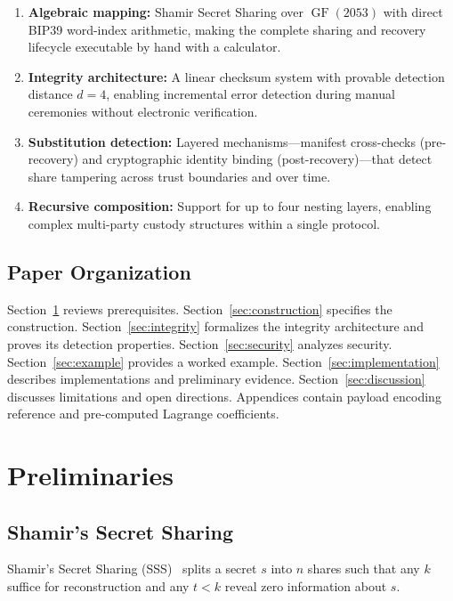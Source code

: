 \documentclass[11pt]{article}
\newcommand{\GF}{\operatorname{GF}}
\begin{document}
\begin{enumerate}[noitemsep]
    \item \textbf{Algebraic mapping:} Shamir Secret Sharing over $\GF(2053)$ with direct BIP39 word-index arithmetic, making the complete sharing and recovery lifecycle executable by hand with a calculator.
    \item \textbf{Integrity architecture:} A linear checksum system with provable detection distance $d = 4$, enabling incremental error detection during manual ceremonies without electronic verification.
    \item \textbf{Substitution detection:} Layered mechanisms---manifest cross-checks (pre-recovery) and cryptographic identity binding (post-recovery)---that detect share tampering across trust boundaries and over time.
    \item \textbf{Recursive composition:} Support for up to four nesting layers, enabling complex multi-party custody structures within a single protocol.
\end{enumerate}

\subsection{Paper Organization}

Section~\ref{sec:prelim} reviews prerequisites. Section~\ref{sec:construction} specifies the construction. Section~\ref{sec:integrity} formalizes the integrity architecture and proves its detection properties. Section~\ref{sec:security} analyzes security. Section~\ref{sec:example} provides a worked example. Section~\ref{sec:implementation} describes implementations and preliminary evidence. Section~\ref{sec:discussion} discusses limitations and open directions. Appendices contain payload encoding reference and pre-computed Lagrange coefficients.

\section{Preliminaries}
\label{sec:prelim}

\subsection{Shamir's Secret Sharing}

Shamir's Secret Sharing (SSS)~\cite{shamir1979} splits a secret $s$ into $n$ shares such that any $k$ suffice for reconstruction and any $t < k$ reveal zero information about $s$.
\end{document}
